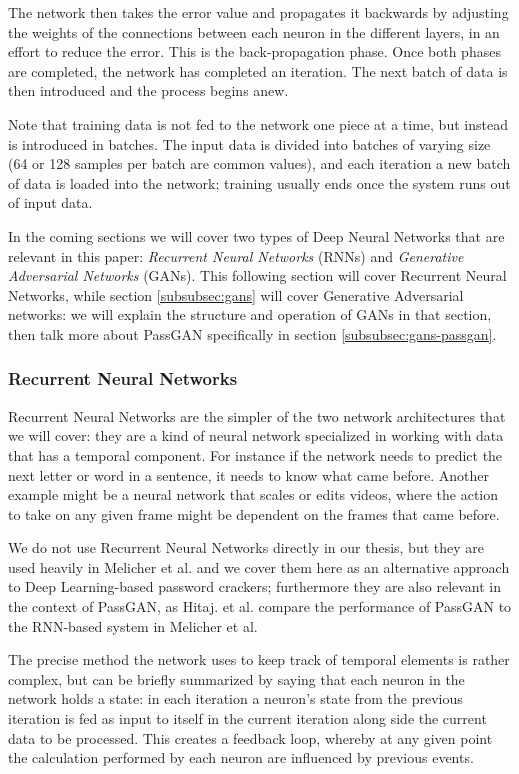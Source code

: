 The network then takes the error value and propagates it backwards by adjusting the weights of the connections between each neuron in the different layers, in an effort to reduce the error. This is the back-propagation phase.
Once both phases are completed, the network has completed an iteration. The next batch of data is then introduced and the process begins anew.

Note that training data is not fed to the network one piece at a time, but instead is introduced in batches. The input data is divided into batches of varying size (64 or 128 samples per batch are common values), and each iteration a new batch of data is loaded into the network; training usually ends once the system runs out of input data.

In the coming sections we will cover two types of Deep Neural Networks that are relevant in this paper: \emph{Recurrent Neural Networks} (RNNs) and  \emph{Generative Adversarial Networks} (GANs).
This following section will cover Recurrent Neural Networks, while section \ref{subsubsec:gans} will cover Generative Adversarial networks: we will explain the structure and operation of GANs in that section, then talk more about PassGAN specifically in section \ref{subsubsec:gans-passgan}.

\subsubsection{Recurrent Neural Networks}
Recurrent Neural Networks are the simpler of the two network architectures that we will cover: they are a kind of neural network specialized in working with data that has a temporal component.
For instance if the network needs to predict the next letter or word in a sentence, it needs to know what came before. Another example might be a neural network that scales or edits videos, where the action to take on any given frame might be dependent on the frames that came before.

We do not use Recurrent Neural Networks directly in our thesis, but they are used heavily in Melicher et al. \cite{Melicher2016} and we cover them here as an alternative approach to Deep Learning-based password crackers; furthermore they are also relevant in the context of PassGAN, as Hitaj. et al. \cite{PassGAN} compare the performance of PassGAN to the RNN-based system in Melicher et al.

The precise method the network uses to keep track of temporal elements is rather complex, but can be briefly summarized by saying that each neuron in the network holds a state: in each iteration a neuron's state from the previous iteration is fed as input to itself in the current iteration along side the current data to be processed.
This creates a feedback loop, whereby at any given point the calculation performed by each neuron are influenced by previous events.


